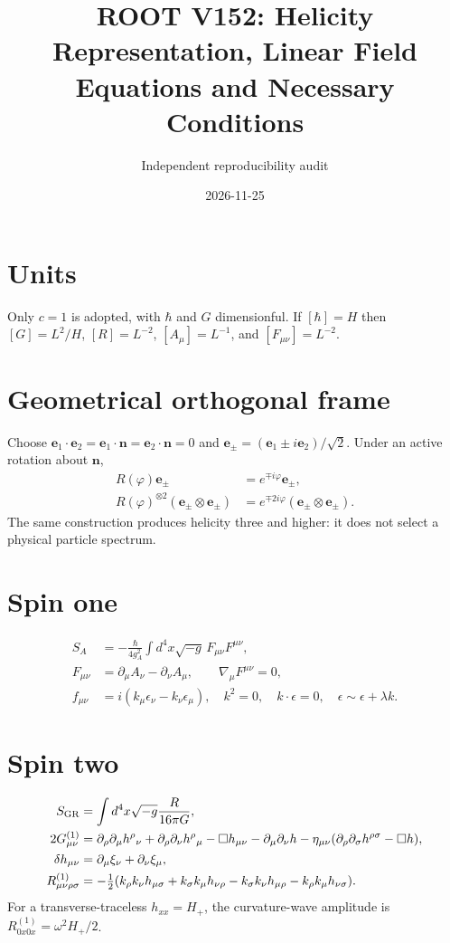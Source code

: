 \documentclass[11pt]{article}
\title{ROOT V152: Helicity Representation, Linear Field Equations and Necessary Conditions}
\author{Independent reproducibility audit}
\date{2026-11-25}
\begin{document}
\maketitle
\section*{Units}
Only $c=1$ is adopted, with $\hbar$ and $G$ dimensionful. If $[\hbar]=H$ then
$[G]=L^2/H$, $[R]=L^{-2}$, $[A_\mu]=L^{-1}$, and $[F_{\mu\nu}]=L^{-2}$.
\section*{Geometrical orthogonal frame}
Choose $\mathbf e_1\cdot\mathbf e_2=\mathbf e_1\cdot\mathbf n=\mathbf e_2\cdot\mathbf n=0$ and
$\mathbf e_\pm=(\mathbf e_1\pm i\mathbf e_2)/\sqrt2$. Under an active rotation about $\mathbf n$,
\begin{align}
 R(\varphi)\mathbf e_\pm&=e^{\mp i\varphi}\mathbf e_\pm,\\
 R(\varphi)^{\otimes 2}(\mathbf e_\pm\otimes\mathbf e_\pm)&=e^{\mp 2i\varphi}(\mathbf e_\pm\otimes\mathbf e_\pm).
\end{align}
The same construction produces helicity three and higher: it does not select a physical particle spectrum.
\section*{Spin one}
\begin{align}
 S_A&=-\frac{\hbar}{4g_A^2}\int d^4x\sqrt{-g}\,F_{\mu\nu}F^{\mu\nu},\\
 F_{\mu\nu}&=\partial_\mu A_\nu-\partial_\nu A_\mu,\qquad \nabla_\mu F^{\mu\nu}=0,\\
 f_{\mu\nu}&=i(k_\mu\epsilon_\nu-k_\nu\epsilon_\mu),\quad k^2=0,\quad k\cdot\epsilon=0,\quad \epsilon\sim\epsilon+\lambda k.
\end{align}
\section*{Spin two}
\begin{align}
 S_{\rm GR}&=\int d^4x\sqrt{-g}\frac{R}{16\pi G},\\
 2G^{(1)}_{\mu\nu}&=\partial_\rho\partial_\mu h^\rho{}_{\nu}+\partial_\rho\partial_\nu h^\rho{}_{\mu}-\Box h_{\mu\nu}-\partial_\mu\partial_\nu h
 -\eta_{\mu\nu}(\partial_\rho\partial_\sigma h^{\rho\sigma}-\Box h),\\
 \delta h_{\mu\nu}&=\partial_\mu\xi_\nu+\partial_\nu\xi_\mu,\\
 R^{(1)}_{\mu\nu\rho\sigma}&=-\tfrac12(k_\rho k_\nu h_{\mu\sigma}+k_\sigma k_\mu h_{\nu\rho}-k_\sigma k_\nu h_{\mu\rho}-k_\rho k_\mu h_{\nu\sigma}).
\end{align}
For a transverse-traceless $h_{xx}=H_+$, the curvature-wave amplitude is $R_{0x0x}^{(1)}=\omega^2 H_+/2$.
\end{document}
